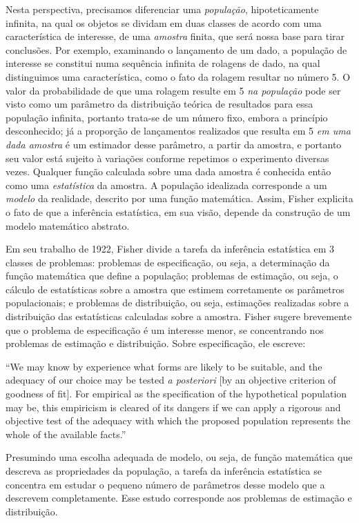 Nesta perspectiva, precisamos diferenciar uma {\em população}, hipoteticamente infinita, na qual os objetos se dividam em duas
classes de acordo com uma característica de interesse, de uma {\em amostra} finita, que será nossa base para tirar conclusões.
Por exemplo, examinando o lançamento de um dado, a população de interesse se constitui numa sequência infinita de rolagens
de dado, na qual distinguimos uma característica, como o fato da rolagem resultar no número 5. O valor da probabilidade de que
uma rolagem resulte em 5 {\em na população} pode ser visto como um parâmetro da distribuição teórica de resultados para essa
população infinita, portanto trata-se de um número fixo, embora a princípio desconhecido; 
já a proporção de lançamentos realizados que resulta em 5 {\em em uma dada amostra} é um estimador desse parâmetro,
a partir da amostra, e portanto seu valor está sujeito à variações conforme repetimos o experimento diversas vezes.
Qualquer função calculada sobre uma dada amostra é conhecida então como uma {\em estatística} da amostra.
A população idealizada corresponde a um {\em modelo} da realidade, descrito por uma função matemática.
Assim, Fisher explicita o fato de que a inferência estatística, em sua visão, depende da construção de um modelo matemático
abstrato.

Em seu trabalho de 1922, Fisher divide a tarefa da inferência estatística em 3 classes de 
problemas: problemas de especificação, ou seja, a determinação da função
matemática que define a população; problemas de estimação, ou seja, o cálculo de estatísticas sobre a amostra que estimem 
corretamente os parâmetros populacionais; e problemas de distribuição, ou seja, estimações realizadas sobre a distribuição
das estatísticas calculadas sobre a amostra. Fisher sugere brevemente que o problema de especificação é um interesse menor,
se concentrando nos problemas de estimação e distribuição. Sobre especificação, ele escreve:

``We may know by experience what forms are likely to be suitable, and the adequacy of our choice may be
tested {\em a posteriori} [by an objective criterion of goodness of fit].
For empirical as the specification of the hypothetical population may be, this empiricism is cleared of its dangers if
we can apply a rigorous and objective test of the adequacy with which the proposed population represents the whole of
the available facts.''\cite{Fisher1922}

Presumindo uma escolha adequada de modelo, ou seja,	de função matemática que descreva as propriedades da população,
a tarefa da inferência estatística se concentra em estudar o pequeno número de parâmetros desse modelo que a descrevem
completamente. Esse estudo corresponde aos problemas de estimação e distribuição.

